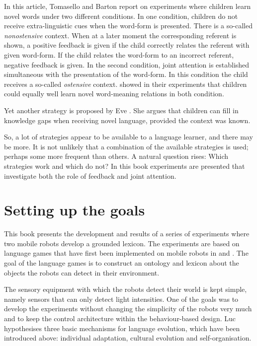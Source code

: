 In this article, Tomasello and Barton report on experiments where children learn novel words under two different conditions. In one condition, children do not receive extra-linguistic cues when the word-form is presented. There is a so-called {\em nonostensive} context. When at a later moment the corresponding referent is shown, a positive feedback is given if the child correctly relates the referent with given word-form. If the child relates the word-form to an incorrect referent, negative feedback is given. In the second condition, joint attention is established simultaneous with the presentation of the word-form. In this condition the child receives a so-called {\em ostensive} context. \citet{tomasellobarton:1994} showed in their experiments that children could equally well learn novel word-meaning relations in both condition.

Yet another strategy is proposed by Eve \citet{clark:1993}. She argues that children can fill in knowledge gaps when receiving novel language, provided the context was known. 


So, a lot of strategies appear to be available to a language learner, and there may be more. It is not unlikely that a combination of the available strategies is used; perhaps some more frequent than others. A natural question rises: Which strategies work and which do not? In this book experiments are presented that investigate both the role of feedback and joint attention.


\section{Setting up the goals}\label{s:intro:goals}

This book presents the development and results of a series of experiments where two mobile robots develop a grounded lexicon. The experiments are based on language games that have first been implemented on mobile robots in \citet{steelsvogt:1997} and \citet{vogt:1997}. The goal of the language games is to construct an ontology and lexicon about the objects the robots can detect in their environment.



The sensory equipment with which the robots detect their world is kept simple, namely sensors that can only detect light intensities. One of the goals was to develop the experiments without changing the simplicity of the robots very much and to keep the control architecture within the behaviour-based design. Luc \citet{steels:1996a} hypothesises three basic mechanisms for language evolution, which have been introduced above: individual adaptation, cultural evolution and self-organisation. 

